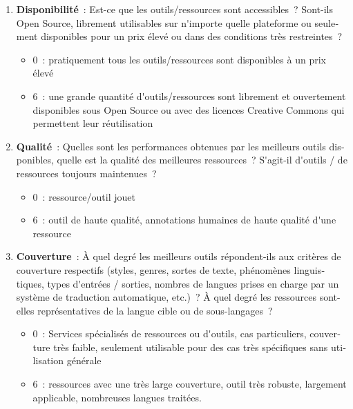 \begin{french}
\begin{multicols}{2}
\begin{enumerate}
\item {\bf Disponibilité}~: Est-ce que les outils/ressources sont accessibles~? Sont-ils Open Source, librement utilisables sur n{\mbox '}importe quelle plateforme ou seulement disponibles pour un prix élevé ou dans des conditions très restreintes~?
      \begin{itemize}
      \item 0~: pratiquement tous les outils/ressources sont disponibles à un prix élevé
      \item 6~: une grande quantité d{\mbox '}outils/ressources sont librement et ouvertement disponibles sous Open Source ou avec des licences Creative Commons qui permettent leur réutilisation
      \end{itemize}

\item {\bf Qualité}~: Quelles sont les performances obtenues par les meilleurs outils disponibles, quelle est la qualité des meilleures ressources~? S{\mbox '}agit-il d{\mbox '}outils / de ressources toujours maintenues~? 
      \begin{itemize}
      \item 0~: ressource/outil jouet
      \item 6~: outil de haute qualité, annotations humaines de haute qualité d{\mbox '}une ressource 
      \end{itemize}

\item {\bf Couverture}~: À quel degré les meilleurs outils répondent-ils aux critères de couverture respectifs (styles, genres, sortes de texte, phénomènes linguistiques, types d{\mbox '}entrées / sorties, nombres de langues prises en charge par un système de traduction automatique, etc.)~? À quel degré les ressources sont-elles représentatives de la langue cible ou de sous-langages~? 
      \begin{itemize}
      \item 0~: Services spécialisés de ressources ou d{\mbox '}outils, cas particuliers, couverture très faible, seulement utilisable pour des cas très spécifiques sans utilisation générale
      \item 6~: ressources avec une très large couverture, outil très robuste, largement applicable, nombreuses langues traitées.
      \end{itemize}


\end{enumerate}
\end{multicols}
\end{french}
